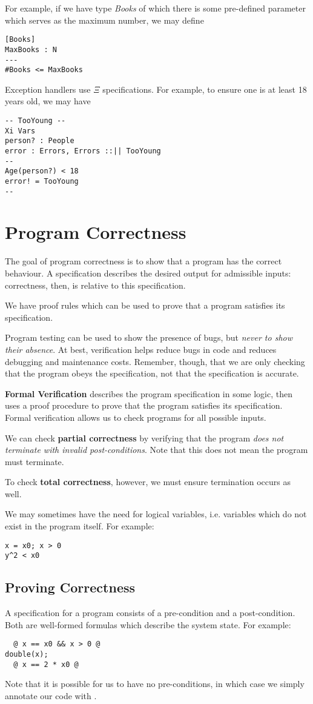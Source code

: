 \documentclass[12pt]{article}
\begin{document}
For example, if we have type {\it Books} of which there is some pre-defined parameter which serves as the maximum number, we may define
\begin{verbatim}
[Books]
MaxBooks : N
---
#Books <= MaxBooks
\end{verbatim}

Exception handlers use $\Xi$ specifications. For example, to ensure one is at least 18 years old, we may have
\begin{verbatim}
-- TooYoung --
Xi Vars
person? : People
error : Errors, Errors ::|| TooYoung
--
Age(person?) < 18
error! = TooYoung
--
\end{verbatim}

\section*{Program Correctness}
The goal of program correctness is to show that a program has the correct behaviour. A specification describes the desired output for admissible inputs: correctness, then, is relative to this specification.

We have proof rules which can be used to prove that a program satisfies its specification.

Program testing can be used to show the presence of bugs, but {\it never to show their absence}. At best, verification helps reduce bugs in code and reduces debugging and maintenance costs. Remember, though, that we are only checking that the program obeys the specification, not that the specification is accurate.

{\bf Formal Verification} describes the program specification in some logic, then uses a proof procedure to prove that the program satisfies its specification. Formal verification allows us to check programs for all possible inputs.

We can check {\bf partial correctness} by verifying that the program {\it does not terminate with invalid post-conditions}. Note that this does not mean the program must terminate.

To check {\bf total correctness}, however, we must ensure termination occurs as well.

We may sometimes have the need for logical variables, i.e. variables which do not exist in the program itself. For example:
\begin{verbatim}
x = x0; x > 0
y^2 < x0
\end{verbatim}

\subsection*{Proving Correctness}
A specification for a program consists of a pre-condition and a post-condition. Both are well-formed formulas which describe the system state. For example:
\begin{verbatim}
  @ x == x0 && x > 0 @
double(x);
  @ x == 2 * x0 @
\end{verbatim}
Note that it is possible for us to have no pre-conditions, in which case we simply annotate our code with .
\end{document}
